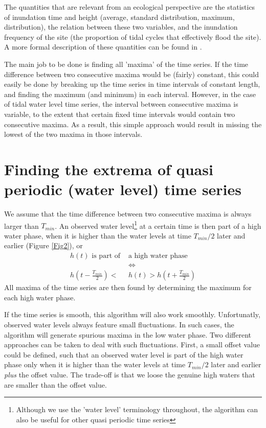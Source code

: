 \documentclass[10pt,a4wide]{article}
\begin{document}
The quantities that are relevant from an ecological perspective are the statistics of inundation time and height (average, standard distribution, maximum, distribution), the relation between these two variables, and the inundation frequency of the site (the proportion of tidal cycles that effectively flood the site). A more formal description of these quantities can be found in \citep{Cox2006}.

The main job to be done is finding all 'maxima' of the time series. If the time difference between two consecutive maxima would be (fairly) constant, this could easily be done by breaking up the time series in time intervals of constant length, and finding the maximum (and minimum) in each interval. However, in the case of tidal water level time series, the interval between consecutive maxima is variable, to the extent that certain fixed time intervals would contain two consecutive maxima. As a result, this simple approach would result in missing the lowest of the two maxima in those intervals. 

\section{Finding the extrema of quasi periodic (water level) time series}
We assume that the time difference between two consecutive maxima is always larger than $T_{min}$. An observed water level\footnote{Although we use the 'water level' terminology throughout, the algorithm can also be useful for other quasi periodic time series} at a certain time is then part of a high water phase, when it is higher than the water levels at time $T_{min}/2$ later and earlier (Figure \ref{Fig2}), or
\begin{align}
h(t) \textrm{ is part of } 	& \textrm{a high water phase} \nonumber\\
\nonumber 			&\Leftrightarrow \\\nonumber
h(t-\frac{T_{min}}{2}) < 	&h(t) > h(t+\frac{T_{min}}{2}) 
\end{align}
All maxima of the time series are then found by determining the maximum for each high water phase.

If the time series is smooth, this algorithm will also work smoothly. Unfortunatly, observed water levels always feature small fluctuations. In such cases, the algorithm will generate spurious maxima in the low water phase. Two different approaches can be taken to deal with such fluctuations. First,  a small offset value could be defined, such that an observed water level is part of the high water phase only when it is higher than the water levels at time $T_{min}/2$ later and earlier \emph{plus} the offset value. The trade-off is that we loose the genuine high waters that are smaller than the offset value.
\end{document}
